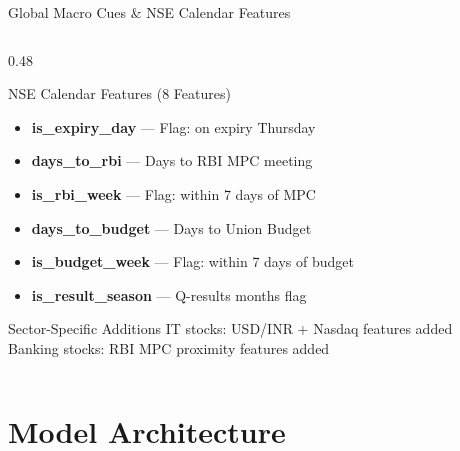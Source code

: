 \documentclass[aspectratio=43,11pt]{beamer}
\begin{document}
\begin{frame}[shrink=12]{Global Macro Cues \& NSE Calendar Features}
\begin{columns}[T]
\begin{column}{0.48\textwidth}
\begin{block}{NSE Calendar Features (8 Features)}
\begin{itemize}
                    \item \textbf{is\_expiry\_day} --- Flag: on expiry Thursday
                    \item \textbf{days\_to\_rbi} --- Days to RBI MPC meeting
                    \item \textbf{is\_rbi\_week} --- Flag: within 7 days of MPC
                    \item \textbf{days\_to\_budget} --- Days to Union Budget
                    \item \textbf{is\_budget\_week} --- Flag: within 7 days of budget
                    \item \textbf{is\_result\_season} --- Q-results months flag
                \end{itemize}
            \end{block}
            \begin{exampleblock}{Sector-Specific Additions}
                \footnotesize IT stocks: USD/INR + Nasdaq features added \\
                Banking stocks: RBI MPC proximity features added
            \end{exampleblock}
        \end{column}
    \end{columns}
\end{frame}

\section{Model Architecture}
\end{document}
